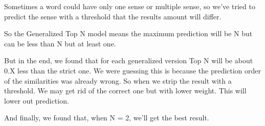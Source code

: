 Sometimes a word could have only one sense or multiple sense, so we've tried to predict the sense with a threshold that the results amount will differ.

So the Generalized Top N model means the maximum prediction will be N but can be less than N but at least one.

But in the end, we found that for each generalized version Top N will be about 0.X less than the strict one. We were guessing this is because the prediction order of the similarities was already wrong. So when we strip the result with a threshold. We may get rid of the correct one but with lower weight. This will lower out prediction. 

And finally, we found that, when N = 2, we'll get the best result.
